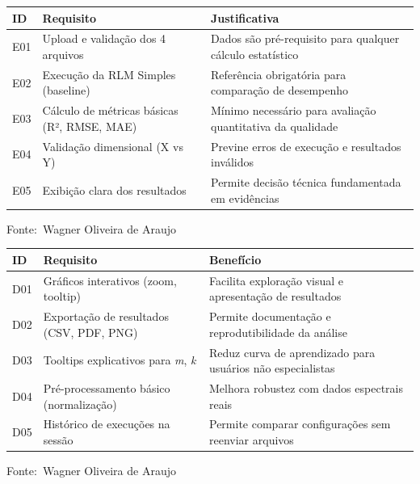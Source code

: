 \documentclass[12pt,a4paper]{article}
\newcommand{\oautor}{Wagner Oliveira de Araujo}
\begin{document}
\begin{quadro}[ht]
\begin{center}
\small
\caption{Requisitos essenciais do sistema (Must Have)}
\label{quadro:essenciais}
\begin{threeparttable}
\begin{tabularx}{\textwidth}{|l|X|X|} \hline
\textbf{ID} & \textbf{Requisito} & \textbf{Justificativa} \\ \hline
E01 & Upload e validação dos 4 arquivos & Dados são pré-requisito para qualquer cálculo estatístico \\ \hline
E02 & Execução da RLM Simples (baseline) & Referência obrigatória para comparação de desempenho \\ \hline
E03 & Cálculo de métricas básicas (R², RMSE, MAE) & Mínimo necessário para avaliação quantitativa da qualidade \\ \hline
E04 & Validação dimensional (X vs Y) & Previne erros de execução e resultados inválidos \\ \hline
E05 & Exibição clara dos resultados & Permite decisão técnica fundamentada em evidências \\ \hline
\end{tabularx}
\begin{tablenotes}[flushleft]
\footnotesize
\item Fonte:~\oautor
\end{tablenotes}
\end{threeparttable}
\end{center}
\end{quadro}

\begin{quadro}[ht]
\begin{center}
\small
\caption{Requisitos desejáveis do sistema (Should Have)}
\label{quadro:desejaveis}
\begin{threeparttable}
\begin{tabularx}{\textwidth}{|l|X|X|} \hline
\textbf{ID} & \textbf{Requisito} & \textbf{Benefício} \\ \hline
D01 & Gráficos interativos (zoom, tooltip) & Facilita exploração visual e apresentação de resultados \\ \hline
D02 & Exportação de resultados (CSV, PDF, PNG) & Permite documentação e reprodutibilidade da análise \\ \hline
D03 & Tooltips explicativos para \textit{m}, \textit{k} & Reduz curva de aprendizado para usuários não especialistas \\ \hline
D04 & Pré-processamento básico (normalização) & Melhora robustez com dados espectrais reais \\ \hline
D05 & Histórico de execuções na sessão & Permite comparar configurações sem reenviar arquivos \\ \hline
\end{tabularx}
\begin{tablenotes}[flushleft]
\footnotesize
\item Fonte:~\oautor
\end{tablenotes}
\end{threeparttable}
\end{center}
\end{quadro}
\end{document}
